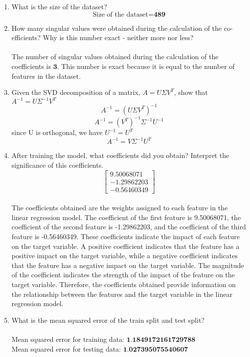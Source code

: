 \documentclass[12pt]{extarticle} %
\begin{document}
\begin{enumerate}
    \item What is the size of the dataset?
    \[
    \text{Size of the dataset} = \textbf{489}
    \]
    \item How many singular values were obtained during the calculation of the co-efficients? Why is this number exact - neither more nor less?
    \\\\ The number of singular values obtained during the calculation of the coefficients is \(\textbf{3}\). This number is exact because it is equal to the number of features in the dataset. 
    \item Given the SVD decomposition of a matrix, \(A = U \Sigma V^T\), show that \(A^{-1} = U\Sigma^{-1}V^T\)
    \[
    A^{-1} = (U \Sigma V^T)^{-1}
    \]
    \[
    A^{-1} = (V^T)^{-1} \Sigma^{-1} U^{-1}
    \]
    since U is orthogonal, we have \(U^{-1} = U^T\)
    \[
    A^{-1} = V \Sigma^{-1} U^T
    \]
    
    \item After training the model, what coefficients did you obtain? Interpret the significance of this coefficients.
    \[
        \begin{bmatrix}
            9.50068071 \\
            -1.29862203 \\
            -0.56460349
        \end{bmatrix}
    \] 
    \\ The coefficients obtained are the weights assigned to each feature in the linear regression model. The coefficient of the first feature is 9.50068071, the coefficient of the second feature is -1.29862203, and the coefficient of the third feature is -0.56460349. These coefficients indicate the impact of each feature on the target variable. A positive coefficient indicates that the feature has a positive impact on the target variable, while a negative coefficient indicates that the feature has a negative impact on the target variable. The magnitude of the coefficient indicates the strength of the impact of the feature on the target variable. Therefore, the coefficients obtained provide information on the relationship between the features and the target variable in the linear regression model.
    \item What is the mean squared error of the train split and test split?
    \\\\ Mean squared error for training data:  \(\textbf{1.1849172161729788}\)
    \\ Mean squared error for testing data:  \(\textbf{1.027395075540607}\)


\end{enumerate}
\end{document}
